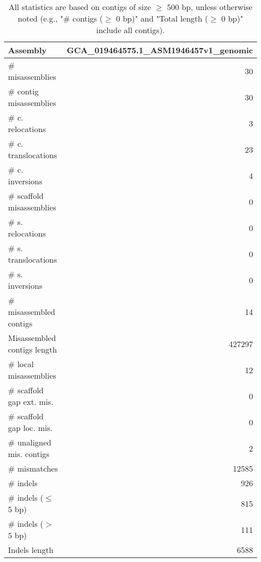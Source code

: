 \documentclass[12pt,a4paper]{article}
\begin{document}
\begin{table}[ht]
\begin{center}
\caption{All statistics are based on contigs of size $\geq$ 500 bp, unless otherwise noted (e.g., "\# contigs ($\geq$ 0 bp)" and "Total length ($\geq$ 0 bp)" include all contigs).}
\begin{tabular}{|l*{1}{|r}|}
\hline
Assembly & GCA\_019464575.1\_ASM1946457v1\_genomic \\ \hline
\# misassemblies & 30 \\ \hline
\hspace{2mm}\# contig misassemblies & 30 \\ \hline
\hspace{5mm}\# c. relocations & 3 \\ \hline
\hspace{5mm}\# c. translocations & 23 \\ \hline
\hspace{5mm}\# c. inversions & 4 \\ \hline
\hspace{2mm}\# scaffold misassemblies & 0 \\ \hline
\hspace{5mm}\# s. relocations & 0 \\ \hline
\hspace{5mm}\# s. translocations & 0 \\ \hline
\hspace{5mm}\# s. inversions & 0 \\ \hline
\# misassembled contigs & 14 \\ \hline
Misassembled contigs length & 427297 \\ \hline
\# local misassemblies & 12 \\ \hline
\# scaffold gap ext. mis. & 0 \\ \hline
\# scaffold gap loc. mis. & 0 \\ \hline
\# unaligned mis. contigs & 2 \\ \hline
\# mismatches & 12585 \\ \hline
\# indels & 926 \\ \hline
\hspace{5mm}\# indels ($\leq$ 5 bp) & 815 \\ \hline
\hspace{5mm}\# indels ($>$ 5 bp) & 111 \\ \hline
Indels length & 6588 \\ \hline
\end{tabular}
\end{center}
\end{table}
\end{document}
